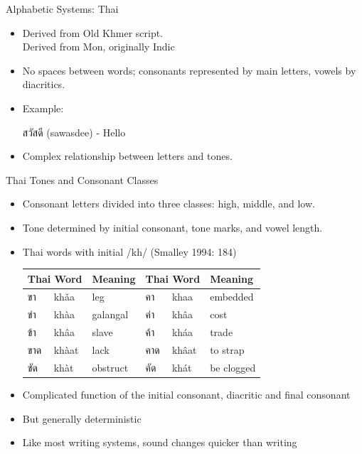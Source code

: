 \documentclass[xetex]{beamer}
\begin{document}
\begin{frame}{Alphabetic Systems: Thai}
\begin{itemize}
\item Derived from Old Khmer script.
  \\ Derived from Mon, originally Indic
    \item No spaces between words; consonants represented by main letters, vowels by diacritics.
    \item Example:
    \begin{exe}
    \ex \textthai{สวัสดี} (sawasdee) - Hello
    \end{exe}
    \item Complex relationship between letters and tones.
\end{itemize}
\end{frame}

\begin{frame}{Thai Tones and Consonant Classes}
\begin{itemize}
    \item Consonant letters divided into three classes: high, middle, and low.
    \item Tone determined by initial consonant, tone marks, and vowel length.
    \item Thai words with initial /kh/ (Smalley 1994: 184)\\
      \begin{tabular}{llllll}
        \multicolumn{2}{l}{\textbf{Thai Word}} & \textbf{Meaning} &   \multicolumn{2}{l}{\textbf{Thai Word}} & \textbf{Meaning} \\
        \hline
        \textthai{ขา}& khǎa & leg &       \textthai{คา}& khaa & embedded \\  
        \textthai{ข่า}& khàa & galangal &  \textthai{ค่า}& khâa & cost \\      
        \textthai{ข้า}& khâa & slave &     \textthai{ค้า}& kháa & trade \\     
        \textthai{ขาด}& khàat & lack &    \textthai{คาด}& khâat & to strap \\
        \textthai{ขัด}& khàt & obstruct &  \textthai{คัด} & khát & be clogged \\
     \end{tabular}
     
   \item  Complicated function of the initial consonant, diacritic and final consonant
   \item But generally deterministic
   \item Like most writing systems, sound changes quicker than writing
  \end{itemize}
\end{frame}
\end{document}
